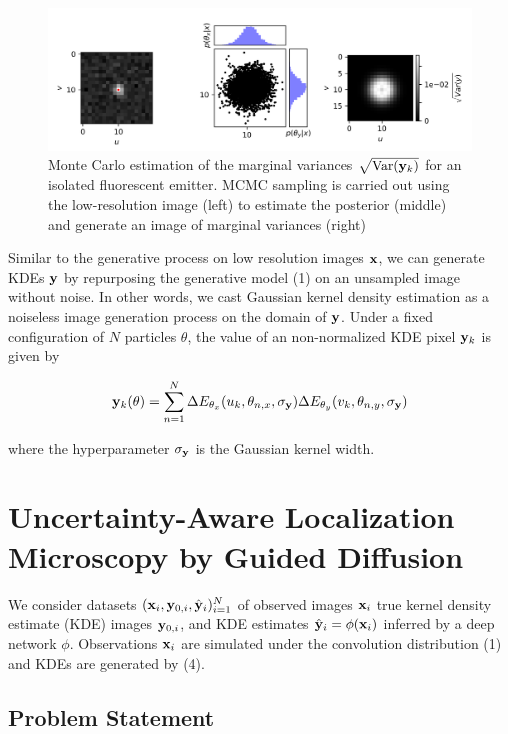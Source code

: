 \documentclass{article}
\begin{document}
\begin{figure}
\includegraphics[scale=0.7]{MCMC.png}
\caption{Monte Carlo estimation of the marginal variances $\sqrt{\mathrm{Var}(\bold{y}_k)}$ for an isolated fluorescent emitter. MCMC sampling is carried out using the low-resolution image (left) to estimate the posterior (middle) and generate an image of marginal variances (right)}
\end{figure}

Similar to the generative process on low resolution images $\bold{x}$, we can generate KDEs $\bold{y}$ by repurposing the generative model (1) on an unsampled image without noise. In other words, we cast Gaussian kernel density estimation as a noiseless image generation process on the domain of $\bold{y}$. Under a fixed configuration of $N$ particles $\theta$, the value of an non-normalized KDE pixel $\bold{y}_{k}$ is given by

\begin{equation}
\bold{y}_{k}(\theta) = \sum_{n=1}^{N}\Delta E_{\theta_x}(u_{k},\theta_{n,x},\sigma_{\bold{y}}) \Delta E_{\theta_y}(v_{k},\theta_{n,y},\sigma_{\bold{y}})
\end{equation}

where the hyperparameter $\sigma_{\bold{y}}$ is the Gaussian kernel width. 

\section{Uncertainty-Aware Localization Microscopy by Guided Diffusion}

We consider datasets $(\bold{x}_i,\bold{y}_{0,i},\hat{\bold{y}}_{i})_{i=1}^{N}$ of observed images $\bold{x}_i$ true kernel density estimate (KDE) images $\bold{y}_{0,i}$, and KDE estimates $\hat{\bold{y}}_{i}=\phi(\bold{x}_{i})$ inferred by a deep network $\phi$. Observations $\bold{x}_i$ are simulated under the convolution distribution (1) and KDEs are generated by (4).

\subsection{Problem Statement}
\end{document}
